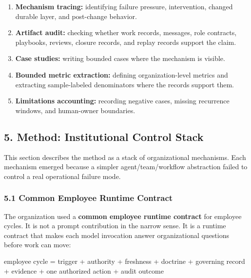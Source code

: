 \documentclass[
]{article}
\newenvironment{Shaded}{}{}
\newcommand{\NormalTok}[1]{#1}
\providecommand{\tightlist}{%
  \setlength{\itemsep}{0pt}\setlength{\parskip}{0pt}}
\begin{document}
\begin{enumerate}
\def\labelenumi{\arabic{enumi}.}
\tightlist
\item
  \textbf{Mechanism tracing:} identifying failure pressure, intervention, changed durable layer, and post-change behavior.
\item
  \textbf{Artifact audit:} checking whether work records, messages, role contracts, playbooks, reviews, closure records, and replay records support the claim.
\item
  \textbf{Case studies:} writing bounded cases where the mechanism is visible.
\item
  \textbf{Bounded metric extraction:} defining organization-level metrics and extracting sample-labeled denominators where the records support them.
\item
  \textbf{Limitations accounting:} recording negative cases, missing recurrence windows, and human-owner boundaries.
\end{enumerate}

\subsection{5. Method: Institutional Control Stack}\label{method-institutional-control-stack}

This section describes the method as a stack of organizational mechanisms. Each mechanism emerged because a simpler agent/team/workflow abstraction failed to control a real operational failure mode.

\subsubsection{5.1 Common Employee Runtime Contract}\label{common-employee-runtime-contract}

The organization used a \textbf{common employee runtime contract} for employee cycles. It is not a prompt contribution in the narrow sense. It is a runtime contract that makes each model invocation answer organizational questions before work can move:

\begin{Shaded}
\begin{Highlighting}[]
\NormalTok{employee cycle =}
\NormalTok{  trigger}
\NormalTok{  + authority}
\NormalTok{  + freshness}
\NormalTok{  + doctrine}
\NormalTok{  + governing record}
\NormalTok{  + evidence}
\NormalTok{  + one authorized action}
\NormalTok{  + audit outcome}
\end{Highlighting}
\end{Shaded}
\end{document}
